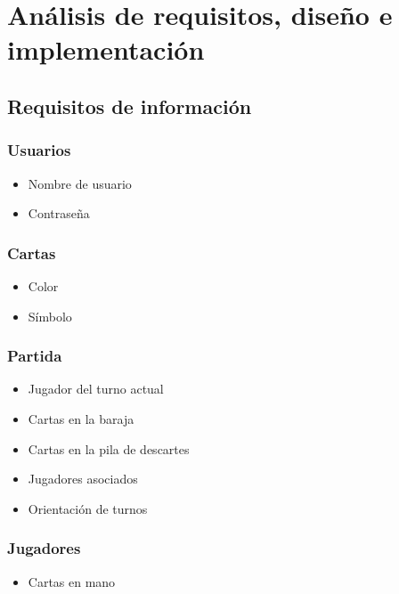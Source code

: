 \newcommand\req{%
  \stepcounter{reqid}%
  R-\padzeroes[3]{\decimal{reqid}}
}
\newcommand\reqcase{%
  \stepcounter{caseid}%
  C-\padzeroes[3]{\decimal{caseid}}
}

\chapter{An\'alisis de requisitos, dise\~no e implementaci\'on}\label{requisitos}

\section{Requisitos de información}
\subsection{Usuarios}
\begin{itemize}
  \item Nombre de usuario
  \item Contraseña
\end{itemize}
\subsection{Cartas}
\begin{itemize}
  \item Color
  \item Símbolo
\end{itemize}
\subsection{Partida}
\begin{itemize}
  \item Jugador del turno actual
  \item Cartas en la baraja
  \item Cartas en la pila de descartes
  \item Jugadores asociados
  \item Orientación de turnos
\end{itemize}
\subsection{Jugadores}
\begin{itemize}
  \item Cartas en mano
\end{itemize}


